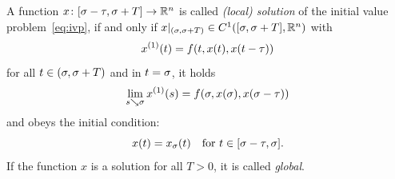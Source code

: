     \begin{definition}\label{def:solution-dde}
        A function $x\colon[\sigma-\tau,\sigma+T]\to\mathbb{R}^n$ is called \emph{(local) solution} of the initial value problem~\eqref{eq:ivp}, if and only if
        $\restrict{x}{(\tzero,\tzero+T)}\in \Cn[1]{\compactum{\tzero}{\tzero+T}}{\R^n}$ with
        \begin{equation*}
            \D{x}(t) = f(t,x(t),x(t-\tau))
        \end{equation*}
        for all $t\in (\sigma,\sigma+T)$ and in $t=\sigma$, it holds
        \begin{equation*}
            \lim_{s\downto \tzero}\D{x}(s)=f(\tzero,x(\tzero),x(\tzero-\tau))
        \end{equation*}
        and obeys the initial condition:
        \begin{equation*}
            x(t) = x_{\sigma}(t) \quad\text{for } t\in [\sigma-\tau,\sigma].
        \end{equation*}
        If the function $x$ is a solution for all $T>0$, it is called \emph{global}.

    \end{definition}

    


\begin{lemma}
    \label{lemma-continuity}

\end{lemma}

